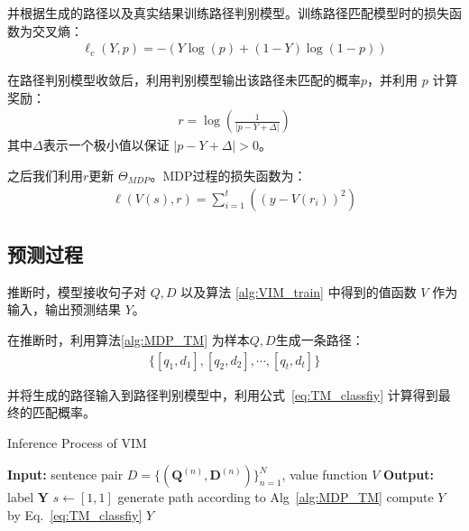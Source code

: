 并根据生成的路径以及真实结果训练路径判别模型。训练路径匹配模型时的损失函数为交叉熵：
\begin{equation}\label{eq:classify_model}
	\begin{aligned}
		\ell_c(Y, p) = -(Y\log(p) + (1-Y)\log(1-p))
	\end{aligned}
\end{equation}

在路径判别模型收敛后，利用判别模型输出该路径未匹配的概率$p$，并利用 $p$ 计算奖励：
\begin{equation}\label{eq:reward}
	\begin{aligned}
		r = \log(\frac{1}{|p-Y+\Delta|})
	\end{aligned}
\end{equation}
其中$\Delta$表示一个极小值以保证 $|p-Y+\Delta| > 0$。

之后我们利用$r$更新 $\Theta_{MDP}$。MDP过程的损失函数为：
\begin{equation}\label{eq:MDP_model}
	\begin{aligned}
		\ell(V(s), r) = \sum_{i=1}^t\left((y - V(r_i))^2\right)
	\end{aligned}
\end{equation}



\subsection{预测过程}
推断时，模型接收句子对 $Q, D$ 以及算法 \ref{alg:VIM_train} 中得到的值函数 $V$ 作为输入，输出预测结果 $Y$。

在推断时，利用算法\ref{alg:MDP_TM} 为样本$Q, D$生成一条路径：
\begin{equation}\label{eq:}
	\begin{aligned}
		\{[q_1, d_1], [q_2, d_2], \cdots, [q_t, d_t]\}
	\end{aligned}
\end{equation}

并将生成的路径输入到路径判别模型中，利用公式~\ref{eq:TM_classfiy} 计算得到最终的匹配概率。

\begin{algorithm}[!htbp]
    \small
    \caption{Inference Process of VIM}\label{alg:TM_inf}
    \begin{algorithmic}
        \STATE \textbf{Input:} sentence pair $D=\{ (\mathbf{Q}^{(n)}, \mathbf{D}^{(n)})\}_{n=1}^N$, value function $V$
        \STATE \textbf{Output:} label $\mathbf{Y}$
        \STATE $s \leftarrow [1,1]$
        \STATE generate path according to Alg~\ref{alg:MDP_TM}
        \STATE compute $Y$ by Eq.~\ref{eq:TM_classfiy}
        \STATE \RETURN  $Y$
    \end{algorithmic}
\end{algorithm}

